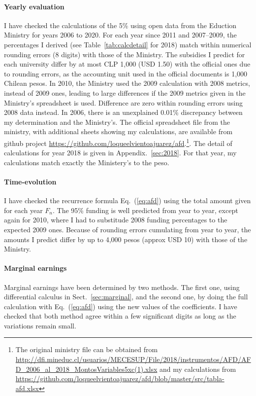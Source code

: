 \documentclass[twocolumn]{article}
\def\eqref#1{Eq.~(\ref{eq:#1})}
\begin{document}
\paragraph{Yearly evaluation} I have checked the calculations of the 5\% using open data from the Eduction Ministry for
years 2006 to 2020. For each year since 2011 and 2007--2009, the percentages I
derived (see Table~\ref{tab:calcdetail} for 2018) match within numerical
rounding errors (8 digits) with those of the Ministry. The subsidies I predict
for each university differ by at most CLP 1,000 (USD 1.50) with the
official ones due to rounding errors, as the accounting unit used in the
official documents is 1,000 Chilean pesos. In 2010, the Ministry used the 2009
calculation with 2008 metrics, instead of 2009 ones, leading to large differences if the 2009 metrics given in the Ministry's spreadsheet is used.  Difference are zero within rounding errors using 2008 data instead. In 2006, there is an unexplained 0.01\% discrepancy between my determination and the Ministry's.  The official spreadsheet file from the ministry, with additional sheets showing my calculations, are available from github project \url{https://github.com/loqueelvientoajuarez/afd}.\footnote{The original ministry file can
be obtained from \url{http://dfi.mineduc.cl/usuarios/MECESUP/File/2018/instrumentos/AFD/AFD_2006_al_2018_MontosVariables5xc(1).xlsx} and my calculations from \url{https://github.com/loqueelvientoajuarez/afd/blob/master/src/tabla-afd.xlsx}}. 
The detail of calculations for year 2018 is given in Appendix.~\ref{sec:2018}.
For that year, my calculations match exactly the Ministery's to the peso.

\paragraph{Time-evolution} I have checked the recurrence formula \eqref{afd} using the total amount given for each year $F_n$.  The 95\% funding is well predicted from year to year, except again for 2010, where I had to substitude 2008 funding percentages to the expected 2009 ones. Because of rounding errors cumulating from year to year, the amounts I predict differ by up to 4,000 pesos (approx USD 10) with those of the Ministry.

\paragraph{Marginal earnings}  Marginal earnings have been determined by two methods.  The first one, using differential calculus in Sect.~\ref{sec:marginal}, and the second one, by doing the full calculation with \eqref{afd} using the new values of the coefficients.  I have checked that both method agree within a few significant digits as long as the variations remain small.
\end{document}
